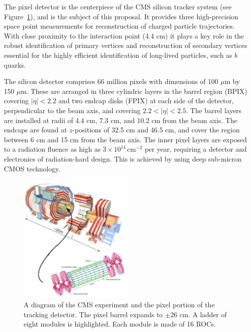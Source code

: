 The pixel detector  is the centerpiece of the CMS silicon tracker system 
(see Figure~\ref{fig:SiPix}), 
and is the subject of this proposal.
It provides three high-precision space point measurements for 
reconstruction of charged particle trajectories. 
With close proximity to the interaction point (4.4 cm) it plays a key role 
in the robust identification of 
primary vertices and reconstruction of secondary vertices essential for 
the highly efficient identification 
of long-lived particles, such as $b$ quarks. 
 
The silicon detector comprises 66 million pixels with dimensions of 100 
$\mu$m by 150 $\mu$m.
These are arranged in three cylindric layers in the barrel region (BPIX) 
covering $|\eta| < 2.2$ 
and two endcap disks (FPIX)  at each side of the detector, perpendicular 
to the beam axis, and covering $2.2 < |\eta| < 2.5$.
The barrel layers are installed at radii of 4.4 cm, 7.3 cm, and 10.2 cm 
from 
the beam axis. The endcaps are found at $z$-positions of 32.5 cm and 46.5 cm, and 
cover the region 
between 6 cm and 15 cm from the beam axis. 
The inner pixel layers are exposed to a radiation fluence as high as 
$3\times 10^{14} \,\mathrm{cm}^{-2} $ 
per year, requiring a detector and electronics of radiation-hard design. 
This is achieved by using deep sub-micron CMOS technology.

%
%
\begin{figure}[htb]
  \centering
  \includegraphics[width=0.5\textwidth]{CMSnSiPix.pdf}
  \caption{\label{fig:SiPix}
  A diagram of the CMS experiment and the pixel portion of the tracking 
detector.
  The pixel barrel expands to $\pm26$ cm. A ladder of eight modules is 
highlighted. Each
module is made of 16 ROCs. 
  }
\end{figure}


